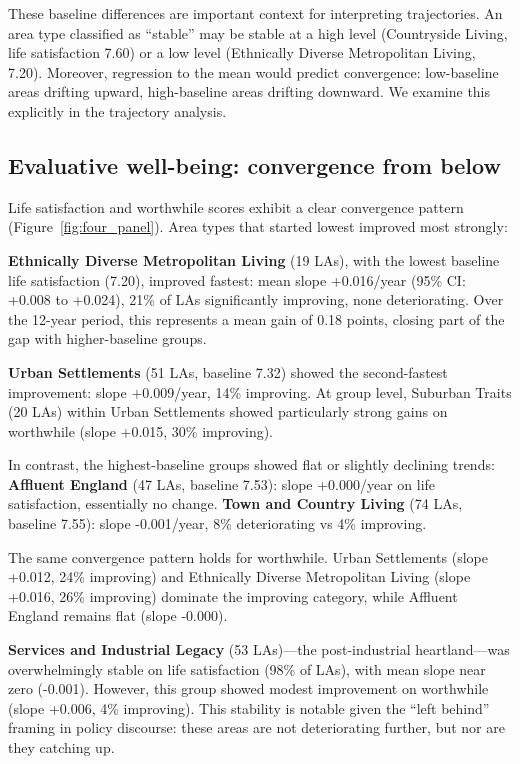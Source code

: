 \documentclass[12pt,a4paper]{article}
\begin{document}
These baseline differences are important context for interpreting trajectories. An area type classified as ``stable'' may be stable at a high level (Countryside Living, life satisfaction 7.60) or a low level (Ethnically Diverse Metropolitan Living, 7.20). Moreover, regression to the mean would predict convergence: low-baseline areas drifting upward, high-baseline areas drifting downward. We examine this explicitly in the trajectory analysis.

\subsection{Evaluative well-being: convergence from below}

Life satisfaction and worthwhile scores exhibit a clear convergence pattern (Figure~\ref{fig:four_panel}). Area types that started lowest improved most strongly:

\textbf{Ethnically Diverse Metropolitan Living} (19 LAs), with the lowest baseline life satisfaction (7.20), improved fastest: mean slope +0.016/year (95\% CI: +0.008 to +0.024), 21\% of LAs significantly improving, none deteriorating. Over the 12-year period, this represents a mean gain of 0.18 points, closing part of the gap with higher-baseline groups.

\textbf{Urban Settlements} (51 LAs, baseline 7.32) showed the second-fastest improvement: slope +0.009/year, 14\% improving. At group level, Suburban Traits (20 LAs) within Urban Settlements showed particularly strong gains on worthwhile (slope +0.015, 30\% improving).

In contrast, the highest-baseline groups showed flat or slightly declining trends:
\textbf{Affluent England} (47 LAs, baseline 7.53): slope +0.000/year on life satisfaction, essentially no change.
\textbf{Town and Country Living} (74 LAs, baseline 7.55): slope -0.001/year, 8\% deteriorating vs 4\% improving.

The same convergence pattern holds for worthwhile. Urban Settlements (slope +0.012, 24\% improving) and Ethnically Diverse Metropolitan Living (slope +0.016, 26\% improving) dominate the improving category, while Affluent England remains flat (slope -0.000).

\textbf{Services and Industrial Legacy} (53 LAs)---the post-industrial heartland---was overwhelmingly stable on life satisfaction (98\% of LAs), with mean slope near zero (-0.001). However, this group showed modest improvement on worthwhile (slope +0.006, 4\% improving). This stability is notable given the ``left behind'' framing in policy discourse: these areas are not deteriorating further, but nor are they catching up.
\end{document}
